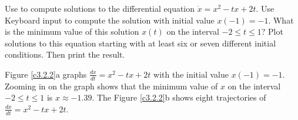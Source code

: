 \documentclass{ximera}
\begin{document}
\begin{exercise} \label{c3.2.2}
Use {\dfield} to compute solutions to the differential equation
$\dot{x} = x^2-tx+2t$. Use {\sf Keyboard input} to compute the solution
with initial value $x(-1)=-1$.  What is the minimum value of this
solution $x(t)$ on the interval $-2\leq t\leq 1$?  Plot
solutions to this equation starting with at least six or seven
different initial conditions. Then print the result.

\begin{solution}

Figure \ref{c3.2.2}a graphs $\frac{dx}{dt} = x^2 -tx +2t$ with the
initial value $x(-1) = -1$.  Zooming in on the graph shows that the
minimum value of $x$ on the interval $-2 \leq t \leq 1$ is $x \approx
-1.39$.  The Figure \ref{c3.2.2}b shows eight trajectories of
$\frac{dx}{dt} = x^2 -tx +2t$.

\begin{figure}[htb]
                       \centerline{%
                       }
\end{figure}

\end{solution}
\end{exercise}
\end{document}
